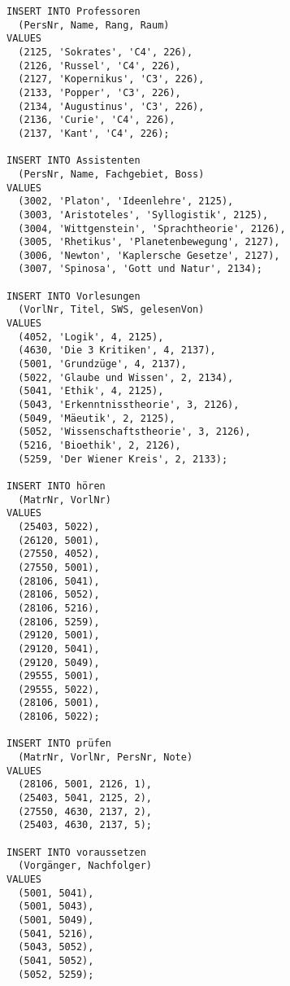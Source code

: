 \documentclass{bschlangaul-aufgabe}
\begin{document}
\begin{verbatim}
INSERT INTO Professoren
  (PersNr, Name, Rang, Raum)
VALUES
  (2125, 'Sokrates', 'C4', 226),
  (2126, 'Russel', 'C4', 226),
  (2127, 'Kopernikus', 'C3', 226),
  (2133, 'Popper', 'C3', 226),
  (2134, 'Augustinus', 'C3', 226),
  (2136, 'Curie', 'C4', 226),
  (2137, 'Kant', 'C4', 226);

INSERT INTO Assistenten
  (PersNr, Name, Fachgebiet, Boss)
VALUES
  (3002, 'Platon', 'Ideenlehre', 2125),
  (3003, 'Aristoteles', 'Syllogistik', 2125),
  (3004, 'Wittgenstein', 'Sprachtheorie', 2126),
  (3005, 'Rhetikus', 'Planetenbewegung', 2127),
  (3006, 'Newton', 'Kaplersche Gesetze', 2127),
  (3007, 'Spinosa', 'Gott und Natur', 2134);

INSERT INTO Vorlesungen
  (VorlNr, Titel, SWS, gelesenVon)
VALUES
  (4052, 'Logik', 4, 2125),
  (4630, 'Die 3 Kritiken', 4, 2137),
  (5001, 'Grundzüge', 4, 2137),
  (5022, 'Glaube und Wissen', 2, 2134),
  (5041, 'Ethik', 4, 2125),
  (5043, 'Erkenntnisstheorie', 3, 2126),
  (5049, 'Mäeutik', 2, 2125),
  (5052, 'Wissenschaftstheorie', 3, 2126),
  (5216, 'Bioethik', 2, 2126),
  (5259, 'Der Wiener Kreis', 2, 2133);

INSERT INTO hören
  (MatrNr, VorlNr)
VALUES
  (25403, 5022),
  (26120, 5001),
  (27550, 4052),
  (27550, 5001),
  (28106, 5041),
  (28106, 5052),
  (28106, 5216),
  (28106, 5259),
  (29120, 5001),
  (29120, 5041),
  (29120, 5049),
  (29555, 5001),
  (29555, 5022),
  (28106, 5001),
  (28106, 5022);

INSERT INTO prüfen
  (MatrNr, VorlNr, PersNr, Note)
VALUES
  (28106, 5001, 2126, 1),
  (25403, 5041, 2125, 2),
  (27550, 4630, 2137, 2),
  (25403, 4630, 2137, 5);

INSERT INTO voraussetzen
  (Vorgänger, Nachfolger)
VALUES
  (5001, 5041),
  (5001, 5043),
  (5001, 5049),
  (5041, 5216),
  (5043, 5052),
  (5041, 5052),
  (5052, 5259);
\end{verbatim}
\end{document}
